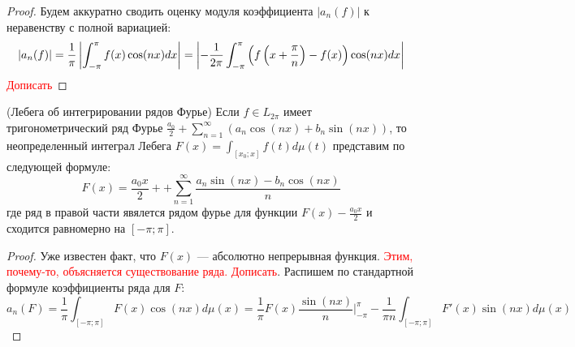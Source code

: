 \begin{proof}
	Будем аккуратно сводить оценку модуля коэффициента $|a_n(f)|$ к неравенству с полной вариацией:
	\[
		|a_n(f)| = \frac{1}{\pi}\left|\int_{-\pi}^\pi f(x)\cos(nx)dx\right| = \left|-\frac{1}{2\pi} \int_{-\pi}^\pi \left(f\left(x + \frac{\pi}{n}\right) - f(x)\right)\cos(nx)dx\right|
	\]
	\textcolor{red}{Дописать}
\end{proof}

\begin{theorem} (Лебега об интегрировании рядов Фурье)
	Если $f \in L_{2\pi}$ имеет тригонометрический ряд Фурье $\frac{a_0}{2} + \sum_{n = 1}^\infty (a_n\cos(nx) + b_n\sin(nx))$, то неопределенный интеграл Лебега $F(x) = \int_{[x_0; x]} f(t)d\mu(t)$ представим по следующей формуле:
	\[
		F(x) = \frac{a_0x}{2} +  + \sum_{n = 1}^\infty \frac{a_n\sin(nx) - b_n\cos(nx)}{n}
	\]
	где ряд в правой части явялется рядом фурье для функции $F(x) - \frac{a_0x}{2}$ и сходится равномерно на $[-\pi; \pi]$.
\end{theorem}

\begin{proof}
	Уже известен факт, что $F(x)$ --- абсолютно непрерывная функция. \textcolor{red}{Этим, почему-то, объясняется существование ряда. Дописать}. Распишем по стандартной формуле коэффициенты ряда для $F$:
	\[
		a_n(F) = \frac{1}{\pi} \int_{[-\pi; \pi]} F(x)\cos(nx)d\mu(x) = \frac{1}{\pi}F(x) \frac{\sin(nx)}{n}|_{-\pi}^\pi - \frac{1}{\pi n} \int_{[-\pi; \pi]} F'(x)\sin(nx)d\mu(x)
	\]
\end{proof}
